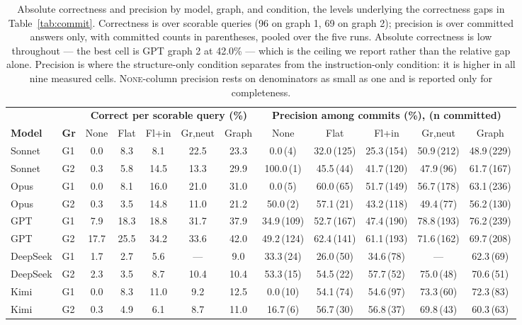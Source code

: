 \documentclass[11pt]{article}
\begin{document}
\begin{table}[t]
\centering
\footnotesize
\setlength{\tabcolsep}{3.2pt}
\begin{tabular}{@{}ll|ccccc|ccccc@{}}
\toprule
 & & \multicolumn{5}{c|}{\textbf{Correct per scorable query (\%)}} & \multicolumn{5}{c}{\textbf{Precision among commits (\%), (n committed)}} \\
\textbf{Model} & \textbf{Gr} & None & Flat & Fl+in & Gr,neut & Graph & None & Flat & Fl+in & Gr,neut & Graph \\
\midrule
Sonnet & G1 & 0.0 & 8.3 & 8.1 & 22.5 & 23.3 & 0.0\,\tiny{(4)} & 32.0\,\tiny{(125)} & 25.3\,\tiny{(154)} & 50.9\,\tiny{(212)} & 48.9\,\tiny{(229)} \\
Sonnet & G2 & 0.3 & 5.8 & 14.5 & 13.3 & 29.9 & 100.0\,\tiny{(1)} & 45.5\,\tiny{(44)} & 41.7\,\tiny{(120)} & 47.9\,\tiny{(96)} & 61.7\,\tiny{(167)} \\
Opus & G1 & 0.0 & 8.1 & 16.0 & 21.0 & 31.0 & 0.0\,\tiny{(5)} & 60.0\,\tiny{(65)} & 51.7\,\tiny{(149)} & 56.7\,\tiny{(178)} & 63.1\,\tiny{(236)} \\
Opus & G2 & 0.3 & 3.5 & 14.8 & 11.0 & 21.2 & 50.0\,\tiny{(2)} & 57.1\,\tiny{(21)} & 43.2\,\tiny{(118)} & 49.4\,\tiny{(77)} & 56.2\,\tiny{(130)} \\
GPT & G1 & 7.9 & 18.3 & 18.8 & 31.7 & 37.9 & 34.9\,\tiny{(109)} & 52.7\,\tiny{(167)} & 47.4\,\tiny{(190)} & 78.8\,\tiny{(193)} & 76.2\,\tiny{(239)} \\
GPT & G2 & 17.7 & 25.5 & 34.2 & 33.6 & 42.0 & 49.2\,\tiny{(124)} & 62.4\,\tiny{(141)} & 61.1\,\tiny{(193)} & 71.6\,\tiny{(162)} & 69.7\,\tiny{(208)} \\
DeepSeek & G1 & 1.7 & 2.7 & 5.6 & --- & 9.0 & 33.3\,\tiny{(24)} & 26.0\,\tiny{(50)} & 34.6\,\tiny{(78)} & --- & 62.3\,\tiny{(69)} \\
DeepSeek & G2 & 2.3 & 3.5 & 8.7 & 10.4 & 10.4 & 53.3\,\tiny{(15)} & 54.5\,\tiny{(22)} & 57.7\,\tiny{(52)} & 75.0\,\tiny{(48)} & 70.6\,\tiny{(51)} \\
Kimi & G1 & 0.0 & 8.3 & 11.0 & 9.2 & 12.5 & 0.0\,\tiny{(10)} & 54.1\,\tiny{(74)} & 54.6\,\tiny{(97)} & 73.3\,\tiny{(60)} & 72.3\,\tiny{(83)} \\
Kimi & G2 & 0.3 & 4.9 & 6.1 & 8.7 & 11.0 & 16.7\,\tiny{(6)} & 56.7\,\tiny{(30)} & 56.8\,\tiny{(37)} & 69.8\,\tiny{(43)} & 60.3\,\tiny{(63)} \\
\bottomrule
\end{tabular}
\caption{Absolute correctness and precision by model, graph, and
condition, the levels underlying the correctness gaps in
Table~\ref{tab:commit}. Correctness is over scorable queries (96 on graph 1,
69 on graph 2); precision is over committed answers only, with committed
counts in parentheses, pooled over the five runs. Absolute correctness is low
throughout --- the best cell is GPT graph 2 at 42.0\% --- which is the ceiling
we report rather than the relative gap alone. Precision is where the
structure-only condition separates from the instruction-only condition: it is
higher in all nine measured cells. \textsc{None}-column precision rests on
denominators as small as one and is reported only for completeness.}
\label{tab:correct}
\end{table}
\end{document}
